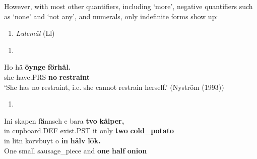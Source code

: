 However, with most other quantifiers, including  ‘more’, negative quantifiers such as  ‘none’ and  ‘not any’, and numerals, only indefinite forms show up:

\begin{enumerate} %
\item 
\textit{Lulemål} (Ll) 
\end{enumerate} %
\setcounter{listLFOxcviiileveli}{0}
\begin{enumerate} %
\item 
\end{enumerate} %
\ea\label{}
\gll Ho  hä  \textbf{öynge} \textbf{förhål.}\\


she  have.PRS  \textbf{no} \textbf{restraint}\\ %


‘She has no restraint, i.e. she cannot restrain herself.’ (Nyström (1993))
\z

\begin{enumerate} %
\item 
\end{enumerate} %
\ea\label{}
\gll Ini  skapen  f\textbf{ä}nnsch  e  bara  \textbf{tvo}\textbf{  kålper,}\\


in  cupboard.DEF  exist.PST  it  only  \textbf{two} \textbf{cold\_potato}\\ %


\ea\label{}
\gll in  litn  korvbuyt  o  \textbf{in}\textbf{  hå}\textbf{l}\textbf{v}\textbf{  lök.}\\


One  small  sausage\_piece  and  \textbf{one} \textbf{half} \textbf{onion}\\ %


